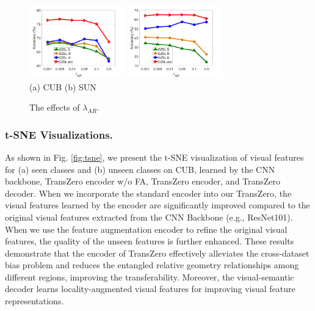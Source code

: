 \documentclass[letterpaper]{article} %
\begin{document}
	\begin{figure}[t]
		\begin{center}
			\includegraphics[width=4.1cm,height=3.2cm]{./figures/CUB-AR.png}
			\includegraphics[width=4.1cm,height=3.2cm]{./figures/SUN-AR.png}\\
			(a) CUB \hspace{3cm} (b) SUN
			\caption{The effects of $\lambda_{AR}$.}
			\label{fig:loss-AR}\vspace{-6mm}
		\end{center}
	\end{figure}
	
	\subsubsection{t-SNE Visualizations.} As shown in Fig. \ref{fig:tsne}, we present the t-SNE visualization \cite{Maaten2008VisualizingDU} of visual features for (a) seen classes and (b) unseen classes on CUB, learned by the CNN backbone, TransZero encoder w/o FA, TransZero encoder, and TransZero decoder. When we incorporate the standard encoder into our TransZero, the visual features learned by the encoder are significantly improved compared to the original visual features extracted from the CNN Backbone (e.g., ResNet101). When we use the feature augmentation encoder to refine the original visual features, the quality of the unseen features is further enhanced. These results demonstrate that the encoder of TransZero effectively alleviates the cross-dataset bias problem and reduces the entangled relative geometry relationships among different regions, improving the transferability. Moreover, the visual-semantic decoder learns locality-augmented visual features for improving visual feature representations.
	
	
	
\end{document}
